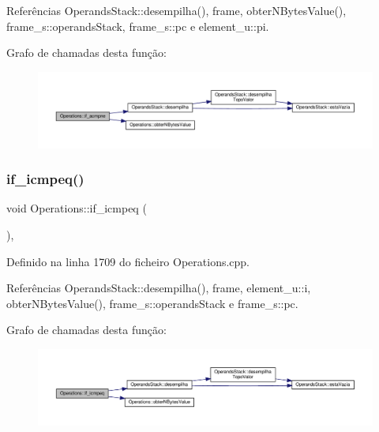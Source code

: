 Referências Operands\+Stack\+::desempilha(), frame, obter\+N\+Bytes\+Value(), frame\+\_\+s\+::operands\+Stack, frame\+\_\+s\+::pc e element\+\_\+u\+::pi.

Grafo de chamadas desta função\+:
\nopagebreak
\begin{figure}[H]
\begin{center}
\leavevmode
\includegraphics[width=350pt]{classOperations_a7f43bbfba9b2feb66b695d24c43dc430_cgraph}
\end{center}
\end{figure}
\mbox{\label{classOperations_a43a49ccd4f1160c0b1968af4296fa2b3}} 
\subsubsection{\texorpdfstring{if\+\_\+icmpeq()}{if\_icmpeq()}}
{\footnotesize\ttfamily void Operations\+::if\+\_\+icmpeq (\begin{DoxyParamCaption}{ }\end{DoxyParamCaption})\hspace{0.3cm}{\ttfamily [static]}, {\ttfamily [private]}}



Definido na linha 1709 do ficheiro Operations.\+cpp.



Referências Operands\+Stack\+::desempilha(), frame, element\+\_\+u\+::i, obter\+N\+Bytes\+Value(), frame\+\_\+s\+::operands\+Stack e frame\+\_\+s\+::pc.

Grafo de chamadas desta função\+:
\nopagebreak
\begin{figure}[H]
\begin{center}
\leavevmode
\includegraphics[width=350pt]{classOperations_a43a49ccd4f1160c0b1968af4296fa2b3_cgraph}
\end{center}
\end{figure}
\mbox{\label{classOperations_a147f088fabd19030a535ac68ff091be1}} 

